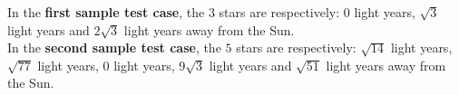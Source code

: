 

\Examples
\begin{example}
%
%
\end{example}


\Explanation
In the \textbf{first sample test case}, the $3$ stars are respectively: $0$ light years, $\sqrt{3}$ light years and $2\sqrt{3}$ light years away from the Sun. \\[2mm]
In the \textbf{second sample test case}, the $5$ stars are respectively: $\sqrt{14}$ light years, $\sqrt{77}$ light years, $0$ light years, $9\sqrt{3}$ light years and $\sqrt{51}$ light years away from the Sun.

